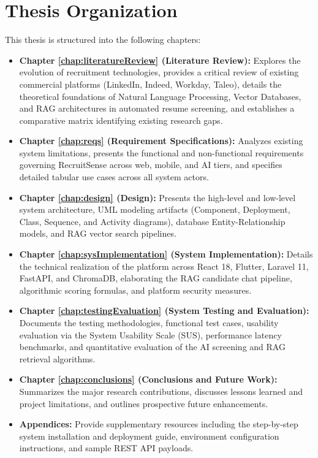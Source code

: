 \section{Thesis Organization}
This thesis is structured into the following chapters:
\begin{itemize}
    \item \textbf{Chapter \ref{chap:literatureReview} (Literature Review):} Explores the evolution of recruitment technologies, provides a critical review of existing commercial platforms (LinkedIn, Indeed, Workday, Taleo), details the theoretical foundations of Natural Language Processing, Vector Databases, and RAG architectures in automated resume screening, and establishes a comparative matrix identifying existing research gaps.
    \item \textbf{Chapter \ref{chap:reqs} (Requirement Specifications):} Analyzes existing system limitations, presents the functional and non-functional requirements governing RecruitSense across web, mobile, and AI tiers, and specifies detailed tabular use cases across all system actors.
    \item \textbf{Chapter \ref{chap:design} (Design):} Presents the high-level and low-level system architecture, UML modeling artifacts (Component, Deployment, Class, Sequence, and Activity diagrams), database Entity-Relationship models, and RAG vector search pipelines.
    \item \textbf{Chapter \ref{chap:sysImplementation} (System Implementation):} Details the technical realization of the platform across React 18, Flutter, Laravel 11, FastAPI, and ChromaDB, elaborating the RAG candidate chat pipeline, algorithmic scoring formulas, and platform security measures.
    \item \textbf{Chapter \ref{chap:testingEvaluation} (System Testing and Evaluation):} Documents the testing methodologies, functional test cases, usability evaluation via the System Usability Scale (SUS), performance latency benchmarks, and quantitative evaluation of the AI screening and RAG retrieval algorithms.
    \item \textbf{Chapter \ref{chap:conclusions} (Conclusions and Future Work):} Summarizes the major research contributions, discusses lessons learned and project limitations, and outlines prospective future enhancements.
    \item \textbf{Appendices:} Provide supplementary resources including the step-by-step system installation and deployment guide, environment configuration instructions, and sample REST API payloads.
\end{itemize}
